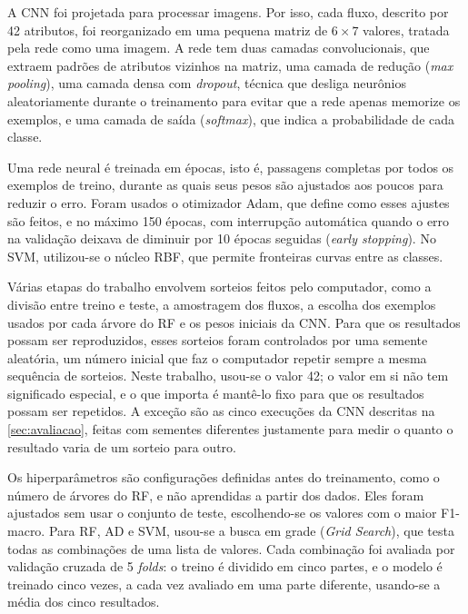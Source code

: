 \documentclass[alpha-refs,brazilian]{CC-EC_TF-TC}
\begin{document}
A CNN foi projetada para processar imagens. Por isso, cada fluxo, descrito por 42 atributos, foi reorganizado em uma pequena matriz de $6 \times 7$ valores, tratada pela rede como uma imagem. A rede tem duas camadas convolucionais, que extraem padrões de atributos vizinhos na matriz, uma camada de redução (\textit{max pooling}), uma camada densa com \textit{dropout}, técnica que desliga neurônios aleatoriamente durante o treinamento para evitar que a rede apenas memorize os exemplos, e uma camada de saída (\textit{softmax}), que indica a probabilidade de cada classe.

Uma rede neural é treinada em épocas, isto é, passagens completas por todos os exemplos de treino, durante as quais seus pesos são ajustados aos poucos para reduzir o erro. Foram usados o otimizador Adam, que define como esses ajustes são feitos, e no máximo 150 épocas, com interrupção automática quando o erro na validação deixava de diminuir por 10 épocas seguidas (\textit{early stopping}). No SVM, utilizou-se o núcleo RBF, que permite fronteiras curvas entre as classes.

Várias etapas do trabalho envolvem sorteios feitos pelo computador, como a divisão entre treino e teste, a amostragem dos fluxos, a escolha dos exemplos usados por cada árvore do RF e os pesos iniciais da CNN. Para que os resultados possam ser reproduzidos, esses sorteios foram controlados por uma semente aleatória, um número inicial que faz o computador repetir sempre a mesma sequência de sorteios. Neste trabalho, usou-se o valor 42; o valor em si não tem significado especial, e o que importa é mantê-lo fixo para que os resultados possam ser repetidos. A exceção são as cinco execuções da CNN descritas na \autoref{sec:avaliacao}, feitas com sementes diferentes justamente para medir o quanto o resultado varia de um sorteio para outro.

Os hiperparâmetros são configurações definidas antes do treinamento, como o número de árvores do RF, e não aprendidas a partir dos dados. Eles foram ajustados sem usar o conjunto de teste, escolhendo-se os valores com o maior F1-macro. Para RF, AD e SVM, usou-se a busca em grade (\textit{Grid Search}), que testa todas as combinações de uma lista de valores. Cada combinação foi avaliada por validação cruzada de 5 \textit{folds}: o treino é dividido em cinco partes, e o modelo é treinado cinco vezes, a cada vez avaliado em uma parte diferente, usando-se a média dos cinco resultados.
\end{document}
